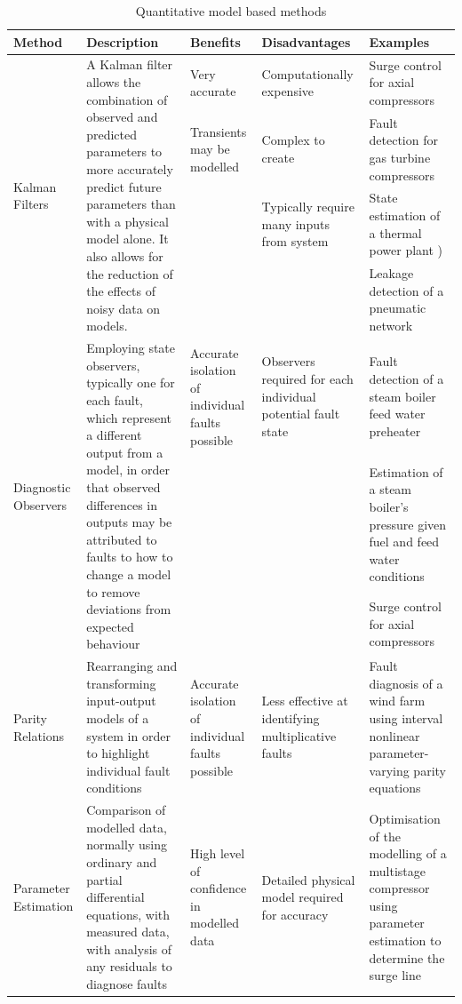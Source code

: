 \begin{table}
\caption{Quantitative model based methods}
\begin{tabular}{p{}p{}p{}p{}p{}}
\toprule
Method &	Description&	Benefits&	Disadvantages&	Examples \\
\toprule
\multirow{4}{.18\textwidth}{Kalman Filters} &\multirow{4}{.18\textwidth}{A Kalman filter allows the combination of observed and predicted parameters to more accurately predict future parameters than with a physical model alone. It also allows for the reduction of the effects of noisy data on models.} & Very accurate&	Computationally expensive&	Surge control for axial compressors \cite{Backi2013}\\
&  &  Transients may be modelled&	Complex to create&	Fault detection for gas turbine compressors \cite{Salar2010} \\
& & & Typically require many inputs from system	&State estimation of a thermal power plant \cite{Nair2011})\\
& & & & Leakage detection of a pneumatic network \cite{Krichel2011}\\
\midrule
\multirow{3}{.18\textwidth}{Diagnostic Observers} & \multirow{3}{.18\textwidth}{Employing state observers, typically one for each fault, which represent a different output from a model, in order that observed differences in outputs may be attributed to faults to how to change a model to remove deviations from expected behaviour} & Accurate isolation of individual faults possible &	Observers required for each individual potential fault state &	Fault detection of a steam boiler feed water preheater \cite{Tarantino2000}\\
 & & & & Estimation of a steam boiler’s pressure given fuel and feed water conditions \cite{Ramezanifar2006}\\
 & & & & Surge control for axial compressors \cite{Backi2013}\\
 \midrule
Parity Relations &	Rearranging and transforming input-output models of a system in order to highlight individual fault conditions &	Accurate isolation of individual faults possible &	Less effective at identifying multiplicative faults &	Fault diagnosis of a wind farm using interval nonlinear parameter-varying parity equations \cite{Blesa2014}\\
\midrule
Parameter Estimation & Comparison of modelled data, normally using ordinary and partial differential equations, with measured data, with analysis of any residuals to diagnose faults
 & High level of confidence in modelled data & Detailed physical model required for accuracy & Optimisation of the modelling of a multistage compressor using parameter estimation to determine the surge line \cite{DapengNiu2011} \\
\bottomrule
\end{tabular}
\label{tab:quantimodel}
\end{table}

